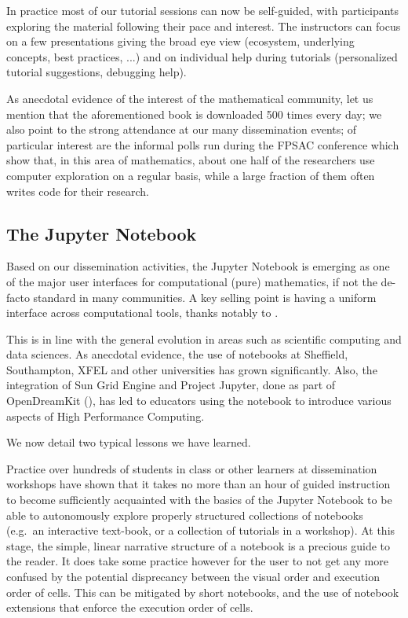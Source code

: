 \documentclass{deliverablereport}
\begin{document}
In practice most of our tutorial sessions can now be self-guided, with
participants exploring the material following their pace and interest.
The instructors can focus on a few presentations giving the broad eye
view (ecosystem, underlying concepts, best practices, ...) and on
individual help during tutorials (personalized tutorial suggestions,
debugging help).

As anecdotal evidence of the interest of the mathematical community,
let us mention that the aforementioned book is downloaded 500 times
every day; we also point to the strong attendance at our many
dissemination events; of particular interest are the informal polls
run during the FPSAC conference which show that, in this area of
mathematics, about one half of the researchers use computer
exploration on a regular basis, while a large fraction of them often
writes code for their research.

\subsection{The Jupyter Notebook}

Based on our dissemination activities, the Jupyter Notebook is
emerging as one of the major user interfaces for computational (pure)
mathematics, if not the de-facto standard in many communities. A key
selling point is having a uniform interface across computational
tools, thanks notably to .

This is in line with the general evolution in areas such as scientific
computing and data sciences. As anecdotal evidence, the use of
notebooks at Sheffield, Southampton, XFEL and other universities has
grown significantly. Also, the integration of Sun Grid Engine and
Project Jupyter, done as part of OpenDreamKit
(), has led to educators using the
notebook to introduce various aspects of High Performance Computing.

We now detail two typical lessons we have learned.

Practice over hundreds of students in class or other learners at
dissemination workshops have shown that it takes no more than an hour of
guided instruction to become sufficiently acquainted with the basics of
the Jupyter Notebook to be able to autonomously explore properly
structured collections of notebooks (e.g.~an interactive text-book, or a
collection of tutorials in a workshop). At this stage, the simple,
linear narrative structure of a notebook is a precious guide to the
reader.
It does take some practice however for the user to not get any more
confused by the potential disprecancy between the visual order and
execution order of cells. This can be mitigated by short notebooks, and
the use of notebook extensions that enforce the execution order of
cells.
\end{document}
